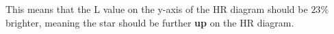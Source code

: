 \documentclass{article}
\begin{document}
\begin{center}
    This means that the L value on the y-axis of the HR diagram should be \(23\%\) brighter, meaning the star should be further \textbf{up} on the HR diagram.
\end{center}





\end{document}
